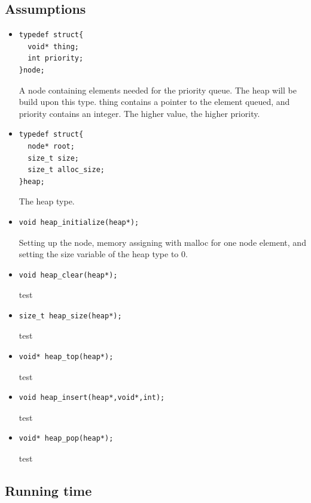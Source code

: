 \documentclass[11pt]{article}
\begin{document}
\subsection*{Assumptions}
\begin{itemize}
\item \begin{lstlisting}[style=customc] 
typedef struct{
  void* thing;
  int priority;
}node;
\end{lstlisting} 
A node containing elements needed for the priority queue. The heap will be build 
upon this type. thing contains a pointer to the element queued, and priority 
contains an integer. The higher value, the higher priority.


\item \begin{lstlisting}[style=customc] 
typedef struct{
  node* root;
  size_t size;
  size_t alloc_size;
}heap;
\end{lstlisting} 
The heap type.


\item \begin{lstlisting}[style=customc] 
void heap_initialize(heap*);\end{lstlisting} 
Setting up the node, memory assigning with malloc for one node element, and setting
the size variable of the heap type to 0.


\item \begin{lstlisting}[style=customc] 
void heap_clear(heap*); \end{lstlisting} 
test


\item \begin{lstlisting}[style=customc] 
size_t heap_size(heap*);\end{lstlisting} 
test


\item \begin{lstlisting}[style=customc] 
void* heap_top(heap*);\end{lstlisting} 
test


\item \begin{lstlisting}[style=customc] 
void heap_insert(heap*,void*,int); \end{lstlisting} 
test

\item \begin{lstlisting}[style=customc] 
void* heap_pop(heap*);\end{lstlisting} 
test


\end{itemize}
\subsection*{Running time}
    
   
\end{document}
